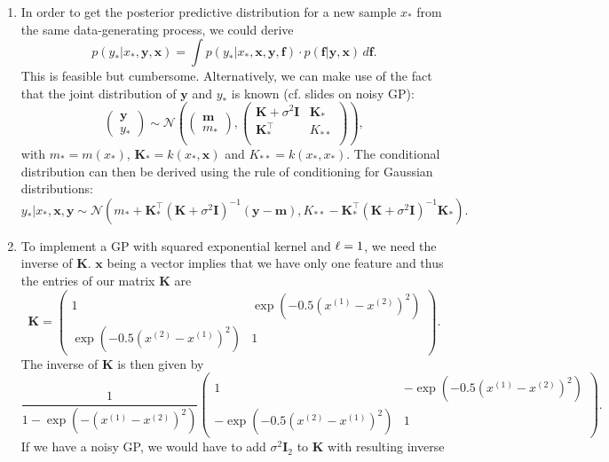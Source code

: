 \documentclass[a4paper]{article}
\begin{document}
{\begin{enumerate}
\begin{equation}
\begin{split}
&\propto \exp(-\frac{1}{2}  (\bm{f}-\bm{f}_{post})^\top \bm{K}^{-1}_{post} (\bm{f}-\bm{f}_{post}))
\end{split}
\end{equation}
which is the so-called \emph{kernel} of a multivariate normal distribution $\mathcal{N}(\bm{f}_{post},\bm{K}_{post} )$, i.e., $\bm{f}|\bm{y} \sim \mathcal{N}(\bm{f}_{post},\bm{K}_{post} )$. 
\item In order to get the posterior predictive distribution for a new sample $x_*$ from the same data-generating process, we could derive $$p(y_* | x_*, \bm{y}, \bm{x}) = \int p(y_*|x_*, \bm{x}, \bm{y}, \bm{f}) \cdot p(\bm{f}|\bm{y},\bm{x}) \,d\bm{f}.$$ This is feasible but cumbersome. Alternatively, we can make use of the fact that the joint distribution of $\bm{y}$ and $y_*$ is known (cf. slides on noisy GP): 
$$\begin{pmatrix} \bm{y} \\ y_* \end{pmatrix} \sim \mathcal{N}\left( \begin{pmatrix} \bm{m} \\ m_* \end{pmatrix}, 
\begin{pmatrix} 
\bm{K} + \sigma^2 \bm{I} & \bm{K}_*\\
\bm{K}^\top_* & K_{**}\\
\end{pmatrix}
\right),$$
with $m_* = m(x_*)$, $\bm{K}_* = k(x_*, \bm{x})$ and $K_{**} = k(x_*,x_*)$.
The conditional distribution can then be derived using the rule of conditioning for Gaussian distributions: $$y_* | x_*, \bm{x}, \bm{y} \sim \mathcal{N}(m_* + \bm{K}^\top_* (\bm{K} + \sigma^2 \bm{I})^{-1}(\bm{y}-\bm{m}), K_{**} - \bm{K}^\top_* (\bm{K} + \sigma^2 \bm{I})^{-1} \bm{K}_*).$$
\item To implement a GP with squared exponential kernel and $\ell = 1$, we need the inverse of $\bm{K}$. $\bm{x}$ being a vector implies that we have only one feature and thus the entries of our matrix $\bm{K}$ are 
$$
\bm{K} = \begin{pmatrix} 1 & \exp(-0.5 (x^{(1)} - x^{(2)})^2) \\ \exp(-0.5 (x^{(2)} - x^{(1)})^2) & 1 \end{pmatrix}.
$$
The inverse of $\bm{K}$ is then given by $$
\frac{1}{1-\exp(-(x^{(1)} - x^{(2)})^2)} \begin{pmatrix} 1 & -\exp(-0.5 (x^{(1)} - x^{(2)})^2) \\ -\exp(-0.5 (x^{(2)} - x^{(1)})^2) & 1 \end{pmatrix}.
$$
If we have a noisy GP, we would have to add $\sigma^2 \bm{I}_2$ to $\bm{K}$ with resulting inverse 


\end{enumerate}}
\end{document}
